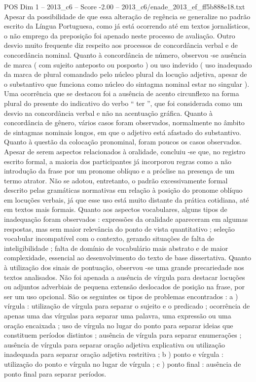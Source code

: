 \begin{textsample}{POS Dim 1 – 2013\_c6 – Score -2.00 – 2013\_c6/enade\_2013\_ef\_ff5b888e18.txt}
Apesar da possibilidade de que essa alteração de regência se generalize no padrão escrito da Língua Portuguesa, como já está ocorrendo até em textos jornalísticos, o não emprego da preposição foi apenado neste processo de avaliação.
Outro desvio muito frequente diz respeito aos processos de concordância verbal e de concordância nominal.
Quanto à concordância de número, observou -se ausência de marca ( com sujeito anteposto ou posposto ) ou uso indevido ( uso inadequado da marca de plural comandado pelo núcleo plural da locução adjetiva, apesar de o substantivo que funciona como núcleo do sintagma nominal estar no singular ).
Uma ocorrência que se destacou foi a ausência de acento circunflexo na forma plural do presente do indicativo do verbo “ ter ”, que foi considerada como um desvio na concordância verbal e não na acentuação gráfica.
Quanto à concordância de gênero, vários casos foram observados, normalmente no âmbito de sintagmas nominais longos, em que o adjetivo está afastado do substantivo.
Quanto à questão da colocação pronominal, foram poucos os casos observados.
Apesar de serem aspectos relacionados à oralidade, concluiu -se que, no registro escrito formal, a maioria dos participantes já incorporou regras como a não introdução da frase por um pronome oblíquo e a próclise na presença de um termo atrator.
Não se adotou, entretanto, o padrão excessivamente formal descrito pelas gramáticas normativas em relação à posição do pronome oblíquo em locuções verbais, já que esse uso está muito distante da prática cotidiana, até em textos mais formais.
Quanto aos aspectos vocabulares, alguns tipos de inadequação foram observados : expressões da oralidade apareceram em algumas respostas, mas sem maior relevância do ponto de vista quantitativo ; seleção vocabular incompatível com o contexto, gerando situações de falta de inteligibilidade ; falta de domínio de vocabulário mais abstrato e de maior complexidade, essencial ao desenvolvimento do texto de base dissertativa.
Quanto à utilização dos sinais de pontuação, observou -se uma grande precariedade nos textos analisados.
Não foi apenada a ausência de vírgula para destacar locuções ou adjuntos adverbiais de pequena extensão deslocados de posição na frase, por ser um uso opcional.
São os seguintes os tipos de problemas encontrados : a ) vírgula : utilização de vírgula para separar o sujeito e o predicado ; ocorrência de apenas uma das vírgulas para separar uma palavra, uma expressão ou uma oração encaixada ; uso de vírgula no lugar do ponto para separar ideias que constituem períodos distintos ; ausência de vírgula para separar enumerações ; ausência de vírgula para separar oração adjetiva explicativa ou utilização inadequada para separar oração adjetiva restritiva ; b ) ponto e vírgula : utilização do ponto e vírgula no lugar de vírgula ; c ) ponto final : ausência de ponto final para separar períodos.

\end{textsample}
